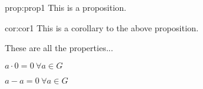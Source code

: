 
\begin{prop}{prop:prop1}
This is a proposition.
\end{prop}

\begin{cor}{cor:cor1}
This is a corollary to the above proposition.
\end{cor}

\begin{prope}[EasyClass]
These are all the properties...
\enum
    \item $a \cdot 0 = 0~\forall a \in G$
    \item $a - a = 0~\forall a \in G$
\stopenum
\end{prope}
